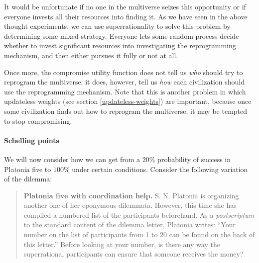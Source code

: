 It would be unfortunate if no one in the multiverse seizes this
opportunity or if everyone invests all their resources into finding it.
As we have seen in the above thought experiments, we can use
superrationality to solve this problem by determining some mixed
strategy. Everyone lets some random process decide whether to invest
significant resources into investigating the reprogramming mechanism,
and then either pursues it fully or not at all.

Once more, the compromise utility function does not tell us \emph{who}
should try to reprogram the multiverse; it does, however, tell us
\emph{how} each civilization should use the reprogramming mechanism.
Note that this is another problem in which updateless weights (see
section \ref{updateless-weights}) are important, because once some civilization finds out how
to reprogram the multiverse, it may be tempted to stop compromising.

\hypertarget{schelling-points}{\paragraph{Schelling
points}\label{schelling-points}}

We will now consider how we can get from a \(20\%\) probability of
success in Platonia five to \(100\%\) under certain conditions. Consider
the following variation of the dilemma:

\begin{quote}
\textbf{Platonia five with coordination help.} S. N. Platonia is
organizing another one of her eponymous dilemmata. However, this time
she has compiled a numbered list of the participants beforehand. As a
\emph{postscriptum} to the standard content of the dilemma letter,
Platonia writes: ``Your number on the list of participants from 1 to 20
can be found on the back of this letter.'' Before looking at your
number, is there any way the superrational participants can ensure that
someone receives the money?
\end{quote}

